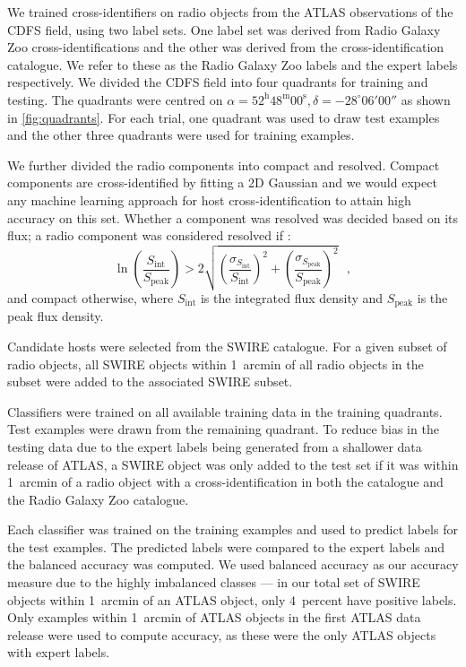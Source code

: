 \documentclass[fleqn,usenatbib,usedcolumn]{mnras}
\begin{document}
    We trained cross-identifiers on radio objects from the ATLAS observations of
    the CDFS field, using two label sets. One label set was derived from Radio
    Galaxy Zoo cross-identifications and the other was derived from the
    \citet{norris06} cross-identification catalogue. We refer to these as the
    Radio Galaxy Zoo labels and the expert labels respectively. We divided the
    CDFS field into four quadrants for training and testing. The quadrants were
    centred on $\alpha = 52^\text{h}48^\text{m}00^\text{s},
    \delta = -28^\circ{}06'00''$ as shown in \autoref{fig:quadrants}. For
    each trial, one quadrant was used to draw test examples and the other three
    quadrants were used for training examples.

    We further divided the radio components into compact and resolved. Compact
    components are cross-identified by fitting a 2D Gaussian \citep[as
    in][]{norris06} and we would expect any machine learning approach for host
    cross-identification to attain high accuracy on this set. Whether a
    component was resolved was decided based on its flux; a radio component was
    considered resolved if \citep{franzen15}:
    \begin{equation}
        \ln \left(
          \frac{S_{\text{int}}}
               {S_{\text{peak}}}
        \right) > 2\sqrt{\left(
          \frac{\sigma_{S_{\text{int}}}}
               {S_{\text{int}}}
        \right)^2 + \left(
          \frac{\sigma_{S_{\text{peak}}}}
               {S_{\text{peak}}}
        \right)^2}\,\,\,\,,
    \end{equation}%
    and compact otherwise, where \(S_{\text{int}}\) is the integrated flux
    density and \(S_{\text{peak}}\) is the peak flux density.

    Candidate hosts were selected from the SWIRE catalogue. For a given subset
    of radio objects, all SWIRE objects within 1~arcmin of all radio objects in
    the subset were added to the associated SWIRE subset.

    Classifiers were trained on all available training data in the training
    quadrants. Test examples were drawn from the remaining quadrant. To reduce
    bias in the testing data due to the expert labels being generated from a
    shallower data release of ATLAS, a SWIRE object was only added to the test
    set if it was within 1~arcmin of a radio object with a cross-identification
    in both the \citet{norris06} catalogue and the Radio Galaxy Zoo catalogue.

    Each classifier was trained on the training examples and used to predict
    labels for the test examples. The predicted labels were compared to the
    expert labels and the balanced accuracy was computed. We used balanced
    accuracy as our accuracy measure due to the highly imbalanced classes --- in
    our total set of SWIRE objects within 1~arcmin of an ATLAS object, only
    4~percent have positive labels. Only examples within 1~arcmin of ATLAS
    objects in the first ATLAS data release \citep{norris06} were used to
    compute accuracy, as these were the only ATLAS objects with expert labels.
\end{document}
